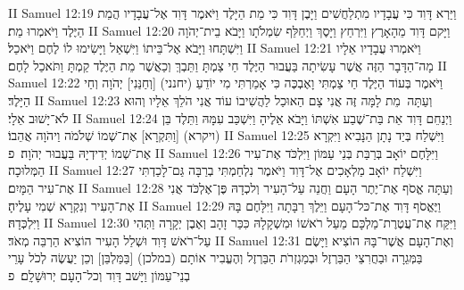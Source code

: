 II Samuel 12:19	וַיַּרְא דָּוִד כִּי עֲבָדָיו מִתְלַחֲשִׁים וַיָּבֶן דָּוִד כִּי מֵת הַיָּלֶד וַיֹּאמֶר דָּוִד אֶל־עֲבָדָיו הֲמֵת הַיֶּלֶד וַיֹּאמְרוּ מֵת׃
II Samuel 12:20	וַיָּקם דָּוִד מֵהָאָרֶץ וַיִּרְחַץ וַיָּסֶךְ וַיְחַלֵּף שִׂמְלֹתָו וַיָּבֹא בֵית־יְהֹוָה וַיִּשְׁתָּחוּ וַיָּבֹא אֶל־בֵּיתוֹ וַיִּשְׁאַל וַיָּשִׂימוּ לוֹ לֶחֶם וַיֹּאכַל׃
II Samuel 12:21	וַיֹּאמְרוּ עֲבָדָיו אֵלָיו מָה־הַדָּבָר הַזֶּה אֲשֶׁר עָשִׂיתָה בַּעֲבוּר הַיֶּלֶד חַי צַמְתָּ וַתֵּבְךְּ וְכַאֲשֶׁר מֵת הַיֶּלֶד קַמְתָּ וַתֹּאכַל לָחֶם׃
II Samuel 12:22	וַיֹּאמֶר בְּעוֹד הַיֶּלֶד חַי צַמְתִּי וָאֶבְכֶּה כִּי אָמַרְתִּי מִי יוֹדֵעַ (יחנני) [וְחַנַּנִי] יְהֹוָה וְחַי הַיָּלֶד׃
II Samuel 12:23	וְעַתָּה  מֵת לָמָּה זֶּה אֲנִי צָם הַאוּכַל לַהֲשִׁיבוֹ עוֹד אֲנִי הֹלֵךְ אֵלָיו וְהוּא לֹא־יָשׁוּב אֵלָי׃
II Samuel 12:24	וַיְנַחֵם דָּוִד אֵת בַּת־שֶׁבַע אִשְׁתּוֹ וַיָּבֹא אֵלֶיהָ וַיִּשְׁכַּב עִמָּהּ וַתֵּלֶד בֵּן (ויקרא) [וַתִּקְרָא] אֶת־שְׁמוֹ שְׁלֹמֹה וַיהֹוָה אֲהֵבוֹ׃
II Samuel 12:25	וַיִּשְׁלַח בְּיַד נָתָן הַנָּבִיא וַיִּקְרָא אֶת־שְׁמוֹ יְדִידְיָהּ בַּעֲבוּר יְהֹוָה׃ {פ}
II Samuel 12:26	וַיִּלָּחֶם יוֹאָב בְּרַבַּת בְּנֵי עַמּוֹן וַיִּלְכֹּד אֶת־עִיר הַמְּלוּכָה׃
II Samuel 12:27	וַיִּשְׁלַח יוֹאָב מַלְאָכִים אֶל־דָּוִד וַיֹּאמֶר נִלְחַמְתִּי בְרַבָּה גַּם־לָכַדְתִּי אֶת־עִיר הַמָּיִם׃
II Samuel 12:28	וְעַתָּה אֱסֹף אֶת־יֶתֶר הָעָם וַחֲנֵה עַל־הָעִיר וְלכְדָהּ פֶּן־אֶלְכֹּד אֲנִי אֶת־הָעִיר וְנִקְרָא שְׁמִי עָלֶיהָ׃
II Samuel 12:29	וַיֶּאֱסֹף דָּוִד אֶת־כּל־הָעָם וַיֵּלֶךְ רַבָּתָה וַיִּלָּחֶם בָּהּ וַיִּלְכְּדָהּ׃
II Samuel 12:30	וַיִּקַּח אֶת־עֲטֶרֶת־מַלְכָּם מֵעַל רֹאשׁוֹ וּמִשְׁקָלָהּ כִּכַּר זָהָב וְאֶבֶן יְקָרָה וַתְּהִי עַל־רֹאשׁ דָּוִד וּשְׁלַל הָעִיר הוֹצִיא הַרְבֵּה מְאֹד׃
II Samuel 12:31	וְאֶת־הָעָם אֲשֶׁר־בָּהּ הוֹצִיא וַיָּשֶׂם בַּמְּגֵרָה וּבַחֲרִצֵי הַבַּרְזֶל וּבְמַגְזְרֹת הַבַּרְזֶל וְהֶעֱבִיר אוֹתָם (במלכן) [בַּמַּלְבֵּן] וְכֵן יַעֲשֶׂה לְכֹל עָרֵי בְנֵי־עַמּוֹן וַיָּשׁב דָּוִד וְכל־הָעָם יְרוּשָׁלָ͏ִם׃ {פ}
